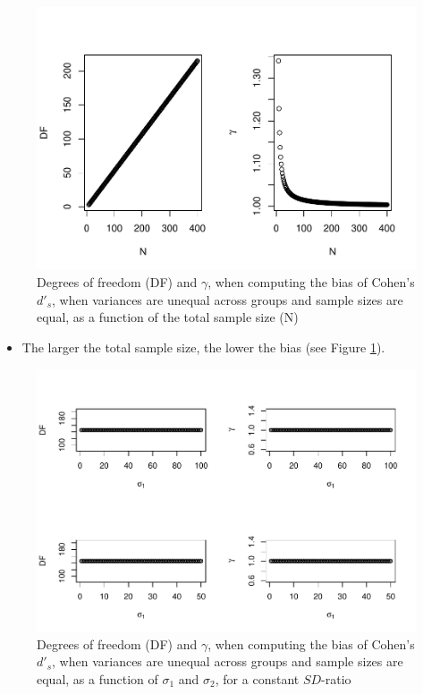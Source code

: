 \documentclass[
  man]{apa6}
\providecommand{\tightlist}{%
  \setlength{\itemsep}{0pt}\setlength{\parskip}{0pt}}
\begin{document}
\begin{figure}
\centering
\includegraphics{Theoretical-Bias-of-all-estimators-as-a-function-of-population-parameters_files/figure-latex/biascohendprimehetbalNsize2-1.pdf}
\caption{\label{fig:biascohendprimehetbalNsize2}Degrees of freedom (DF) and \(\gamma\), when computing the bias of Cohen's \(d'_s\), when variances are unequal across groups and sample sizes are equal, as a function of the total sample size (N)}
\end{figure}

\begin{itemize}
\tightlist
\item
  The larger the total sample size, the lower the bias (see Figure \ref{fig:biascohendprimehetbalNsize2}).
\end{itemize}

\begin{figure}
\centering
\includegraphics{Theoretical-Bias-of-all-estimators-as-a-function-of-population-parameters_files/figure-latex/biascohendprimehetbalvariance2-1.pdf}
\caption{\label{fig:biascohendprimehetbalvariance2}Degrees of freedom (DF) and \(\gamma\), when computing the bias of Cohen's \(d'_s\), when variances are unequal across groups and sample sizes are equal, as a function of \(\sigma_1\) and \(\sigma_2\), for a constant \(SD\)-ratio}
\end{figure}
\end{document}
